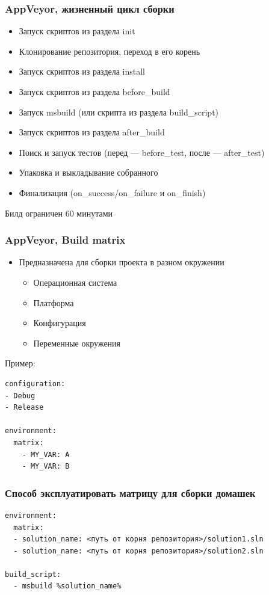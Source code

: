 \documentclass[xetex,mathserif,serif]{beamer}
\begin{document}
	\begin{frame}
		\frametitle{AppVeyor, жизненный цикл сборки}
		\begin{itemize}
			\item Запуск скриптов из раздела init
			\item Клонирование репозитория, переход в его корень
			\item Запуск скриптов из раздела install
			\item Запуск скриптов из раздела before\_build
			\item Запуск msbuild (или скрипта из раздела build\_script)
			\item Запуск скриптов из раздела after\_build 
			\item Поиск и запуск тестов (перед --- before\_test, после --- after\_test)
			\item Упаковка и выкладывание собранного
			\item Финализация (on\_success/on\_failure и on\_finish)
		\end{itemize}
		Билд ограничен 60 минутами
	\end{frame}

	\begin{frame}[fragile]
		\frametitle{AppVeyor, Build matrix}
		\begin{itemize}
			\item Предназначена для сборки проекта в разном окружении
			\begin{itemize}
				\item Операционная система
				\item Платформа
				\item Конфигурация
				\item Переменные окружения
			\end{itemize}
		\end{itemize}
		Пример:
		\begin{verbatim}
configuration:
- Debug
- Release

environment:
  matrix:
    - MY_VAR: A
    - MY_VAR: B
		\end{verbatim}
	\end{frame}

	\begin{frame}[fragile]
		\frametitle{Способ эксплуатировать матрицу для сборки домашек}
		\begin{verbatim}
environment:
  matrix:
  - solution_name: <путь от корня репозитория>/solution1.sln
  - solution_name: <путь от корня репозитория>/solution2.sln

build_script:
  - msbuild %solution_name%
		\end{verbatim}
	\end{frame}
\end{document}
